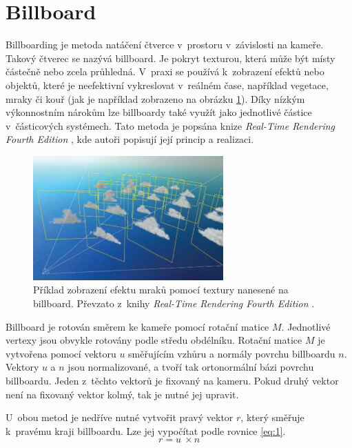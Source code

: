 \section{Billboard}
Billboarding je metoda natáčení čtverce v~prostoru v~závislosti na kameře. Takový čtverec se nazývá billboard. Je pokryt texturou, která může být místy částečně nebo zcela průhledná. V~praxi se používá k~zobrazení efektů nebo objektů, které je neefektivní vykreslovat v~reálném čase, například vegetace, mraky či kouř (jak je například zobrazeno na obrázku \ref{fig:billboard_expample}). Díky nízkým výkonnostním nárokům lze billboardy také využít jako jednotlivé částice v~částicových systémech. Tato metoda je popsána knize \emph{Real-Time Rendering Fourth Edition}  \cite[kapitola~13.6]{ller2018real}, kde autoři popisují její princip a realizaci. 
\begin{figure}[H]
	\centering
	\includegraphics[width=0.65\textwidth]{obrazky-figures/test4.png}
	\caption{Příklad zobrazení efektu mraků pomocí textury nanesené na billboard. Převzato z~knihy \emph{Real-Time Rendering Fourth Edition} \cite[kapitola 13.6]{ller2018real}. }
	\label{fig:billboard_expample}
\end{figure}

Billboard je rotován směrem ke kameře pomocí rotační matice \(M\). Jednotlivé vertexy jsou obvykle rotovány podle středu obdélníku. Rotační matice \(M\) je vytvořena pomocí vektoru \(u\) směřujícím vzhůru a normály povrchu billboardu \(n\). Vektory \(u\) a \(n\) jsou normalizované, a tvoří tak ortonormální bázi povrchu billboardu. Jeden z~těchto vektorů je fixovaný na kameru. Pokud druhý vektor není na fixovaný vektor kolmý, tak je nutné jej upravit.

U~obou metod je nedříve nutné vytvořit pravý vektor \(r\), který směřuje k~pravému kraji billboardu. Lze jej vypočítat podle rovnice \ref{eq:1}.
\begin{equation}
r = u~\times n
\label{eq:1}
\end{equation}

